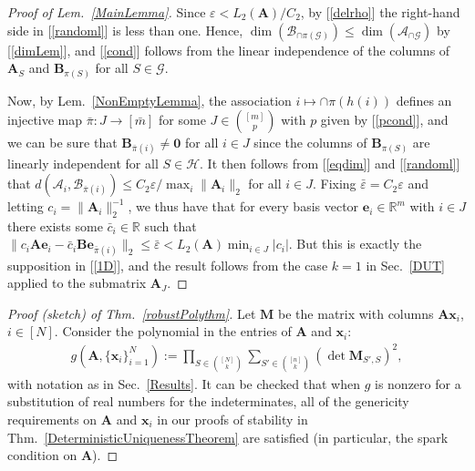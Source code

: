 \documentclass[9pt,twocolumn]{pnas-new}
\renewcommand{\eqref}[1]{\textnormal{[\ref{#1}]}}
\begin{document}
\begin{proof}[Proof of Lem.~\ref{MainLemma}]
Since $\varepsilon < L_2(\mathbf{A}) / C_2$, by \eqref{delrho} the right-hand side in \eqref{randoml} is less than one. Hence, $\dim(\bm{\mathcal{B}}_{\cap \pi(\mathcal{G})}) \leq \dim(\bm{\mathcal{A}}_{\cap \mathcal{G}})$ by \eqref{dimLem}, and \eqref{cond} follows from the linear independence of the columns of $\mathbf{A}_{S}$ and $\mathbf{B}_{\pi(S)}$ for all $S \in \mathcal{G}$.

Now, by Lem.~\ref{NonEmptyLemma}, the association $i \mapsto \cap \pi(h(i))$ defines an injective map $\bar \pi: J \to [\bar m]$ for some $J \in {[m] \choose p}$ with $p$ given by \eqref{pcond}, and we can be sure that $\mathbf{B}_{\bar \pi(i)} \neq \mathbf{0}$ for all $i \in J$ since the columns of $\mathbf{B}_{\pi(S)}$ are linearly independent for all $S \in \mathcal{H}$. It then follows from \eqref{eqdim} and \eqref{randoml} that $d\left( \bm{\mathcal{A}}_i, \bm{\mathcal{B}}_{\bar \pi(i)} \right) \leq C_2 \varepsilon / \max_i \|\mathbf{A}_i\|_2$ for all $i \in J$. Fixing $\bar \varepsilon = C_2\varepsilon$ and letting $c_i = \|\mathbf{A}_i\|_2^{-1}$, we thus have that for every basis vector $\mathbf{e}_i \in \mathbb{R}^m$ with $i \in J$ there exists some $\bar{c}_i \in \mathbb{R}$ such that $\|c_i\mathbf{A}\mathbf{e}_i - \bar{c}_i \mathbf{B}\mathbf{e}_{\bar \pi(i)}\|_2 \leq \bar \varepsilon < L_2(\mathbf{A}) \min_{i\in J} |c_i|$.  But this is exactly the supposition in \eqref{1D}, and the result follows from the case $k=1$ in Sec.~\ref{DUT} applied to the submatrix $\mathbf{A}_J$.
\end{proof}


\begin{proof}[Proof (sketch) of Thm.~\ref{robustPolythm}]
Let $\textbf{M}$ be the matrix with columns $\mathbf{A}\mathbf{x}_i$, $i \in [N]$.  Consider the polynomial in the entries of $\mathbf{A}$ and $\mathbf{x}_i$:
\begin{align*}
g(\mathbf{A}, \{\mathbf{x}_i\}_{i=1}^N) := \prod_{S \in {[N] \choose k}} \sum_{S' \in {[n] \choose k}} (\det \textbf{M}_{S',S})^2,
\end{align*}
with notation as in Sec.~\ref{Results}.  
It can be checked that when $g$ is nonzero for a substitution of real numbers for the indeterminates, all of the genericity requirements on $\mathbf{A}$ and $\mathbf{x}_i$ in our proofs of stability in Thm.~\ref{DeterministicUniquenessTheorem} are satisfied (in particular, the spark condition on $\mathbf{A}$).
\end{proof}
\end{document}
